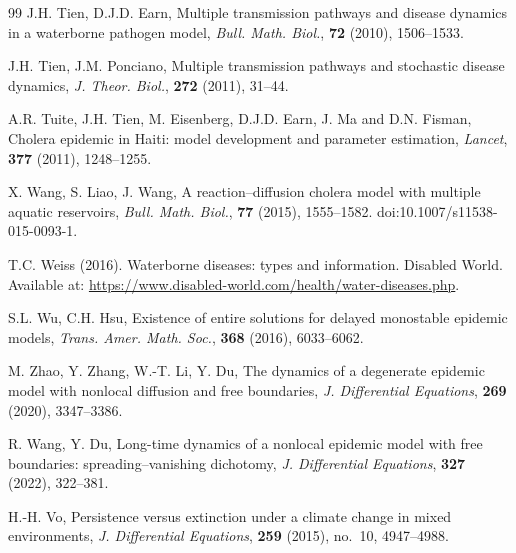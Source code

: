 \documentclass[a4paper,11pt]{amsart}
\theoremstyle{definition}
\numberwithin{equation}{section}
\theoremstyle{definition}
\begin{document}
\begin{thebibliography}{99}
J.H. Tien, D.J.D. Earn,
Multiple transmission pathways and disease dynamics in a waterborne pathogen model,
\textit{Bull. Math. Biol.}, \textbf{72} (2010), 1506--1533.




J.H. Tien, J.M. Ponciano,
Multiple transmission pathways and stochastic disease dynamics,
\textit{J. Theor. Biol.}, \textbf{272} (2011), 31--44.

A.R. Tuite, J.H. Tien, M. Eisenberg, D.J.D. Earn, J. Ma and D.N. Fisman,
Cholera epidemic in Haiti: model development and parameter estimation,
\textit{Lancet}, \textbf{377} (2011), 1248--1255.

X. Wang, S. Liao, J. Wang,
A reaction--diffusion cholera model with multiple aquatic reservoirs,
\textit{Bull. Math. Biol.}, \textbf{77} (2015), 1555--1582.
doi:10.1007/s11538-015-0093-1.



T.C. Weiss (2016).
Waterborne diseases: types and information.
Disabled World. Available at: \url{https://www.disabled-world.com/health/water-diseases.php}.

S.L. Wu, C.H. Hsu,
Existence of entire solutions for delayed monostable epidemic models,
\textit{Trans. Amer. Math. Soc.}, \textbf{368} (2016), 6033--6062.


M. Zhao, Y. Zhang, W.-T. Li, Y. Du,
The dynamics of a degenerate epidemic model with nonlocal diffusion and free boundaries,
\textit{J. Differential Equations}, \textbf{269} (2020), 3347--3386.



R. Wang, Y. Du,
Long-time dynamics of a nonlocal epidemic model with free boundaries: spreading--vanishing dichotomy,
\textit{J. Differential Equations}, \textbf{327} (2022), 322--381.

H.-H. Vo,
Persistence versus extinction under a climate change in mixed environments,
\textit{J. Differential Equations}, \textbf{259} (2015), no.~10, 4947--4988.

\end{thebibliography}
\end{document}
